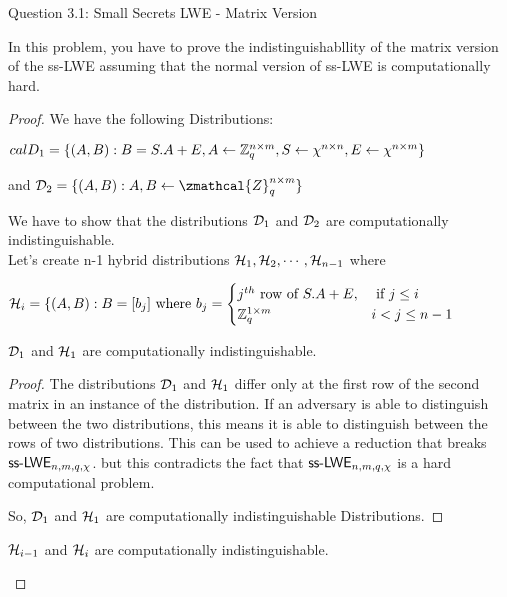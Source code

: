 \begin{solution}{Question 3.1: Small Secrets LWE - Matrix Version}\label{ques:31}
    \begin{question}
    In this problem, you have to prove the indistinguishabllity of the matrix version of the ss-LWE assuming that the normal version of ss-LWE is computationally hard. 
    \end{question}
    \tcblower{}
    
    \begin{proof}
    We have the following Distributions:

    $calD_{1} = \{ (A,B): B = S . A + E, A \leftarrow \mathbb{Z}_q^{n\times m}, S \leftarrow \chi^{n\times n}, E \leftarrow \chi^{n\times m}\}$

    and $\calD_{2} = \{ (A,B):  A,B \leftarrow \zmathcal{Z}_q^{n\times m} \}$

    We have to show that the distributions $\mathcal{D}_1$ and $\mathcal{D}_2$ are computationally indistinguishable.\\
    
    Let's create n-1 hybrid distributions $\mathcal{H}_1,\mathcal{H}_2,\cdots,\mathcal{H}_{n-1}$ where 

    $\mathcal{H}_i = \{ (A,B): B = [b_j] \text{ where }b_j = 
    \begin{cases}
    j^{th} \text{ row of } S.A+E, &\text{ if } j \leq i\\
    \mathbb{Z}_q^{1\times m} &i < j\leq n-1 
    \end{cases}$

    \begin{claim}
    $\mathcal{D}_1$ and $\mathcal{H}_1$ are computationally indistinguishable.
    \end{claim}

    \begin{proof}
        The distributions $\mathcal{D}_1$ and $\mathcal{H}_1$ differ only at the first row of the second matrix in an instance of the distribution. If an adversary is able to distinguish between the two distributions,  this means it is able to distinguish between the rows of two distributions. This can be used to achieve a reduction that breaks $\mathsf{ss\text{-}LWE}_{n,m,q,\chi}$. but this contradicts the fact that $\mathsf{ss\text{-}LWE}_{n,m,q,\chi}$ is a hard computational problem.

        So, $\mathcal{D}_1$ and $\mathcal{H}_1$ are computationally indistinguishable Distributions.
        
    \end{proof}

    \begin{claim}
    $\mathcal{H}_{i-1}$ and $\mathcal{H}_{i}$ are computationally indistinguishable.
    \end{claim}


\end{proof}
\end{solution}
